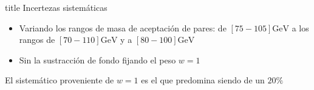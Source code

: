 \documentclass[10pt, compress,spanish]{beamer}
\begin{document}
\begin{frame}[fragile]

\normalsize



\begin{beamercolorbox}[leftskip=\titlelf]{title}
\normalsize Incertezas sistemáticas
\end{beamercolorbox}

\begin{itemize}

\item Variando los rangos de masa de aceptación de pares: de $[75-105]\text{GeV}$ a los rangos de $[70-110]\text{GeV}$ y a $[80-100]\text{GeV}$

\item Sin la sustracción de fondo fijando el peso $w=1$

\end{itemize}

\vspace{1.5cm}

El sistemático proveniente de $w=1$ es el que predomina siendo de un $20\%$

\end{frame}



\end{document}
